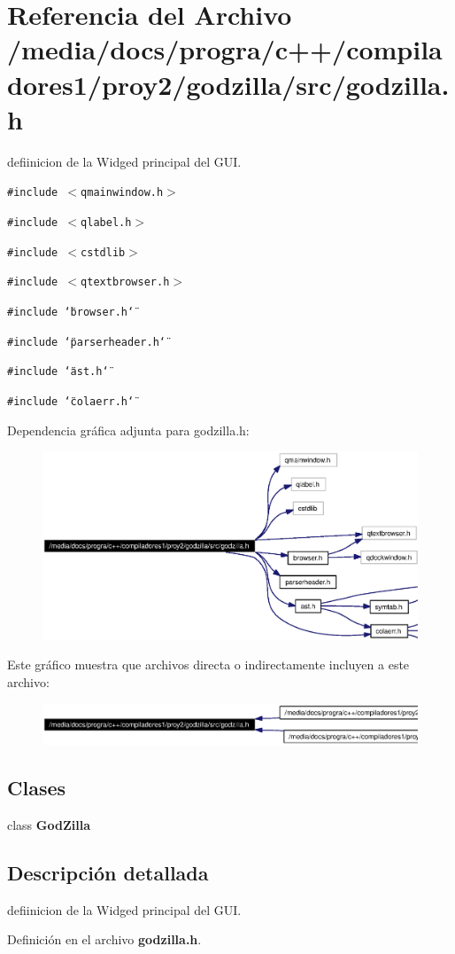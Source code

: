 \section{Referencia del Archivo /media/docs/progra/c++/compiladores1/proy2/godzilla/src/godzilla.h}
\label{godzilla_8h}
defiinicion de la Widged principal del GUI. 

{\tt \#include $<$qmainwindow.h$>$}\par
{\tt \#include $<$qlabel.h$>$}\par
{\tt \#include $<$cstdlib$>$}\par
{\tt \#include $<$qtextbrowser.h$>$}\par
{\tt \#include \char`\"{}browser.h\char`\"{}}\par
{\tt \#include \char`\"{}parserheader.h\char`\"{}}\par
{\tt \#include \char`\"{}ast.h\char`\"{}}\par
{\tt \#include \char`\"{}colaerr.h\char`\"{}}\par


Dependencia gr\'{a}fica adjunta para godzilla.h:\begin{figure}[H]
\begin{center}
\leavevmode
\includegraphics[width=352pt]{godzilla_8h__incl}
\end{center}
\end{figure}


Este gr\'{a}fico muestra que archivos directa o indirectamente incluyen a este archivo:\begin{figure}[H]
\begin{center}
\leavevmode
\includegraphics[width=358pt]{godzilla_8h__dep__incl}
\end{center}
\end{figure}
\subsection*{Clases}
\begin{CompactItemize}
\item 
class {\bf God\-Zilla}
\end{CompactItemize}


\subsection{Descripci\'{o}n detallada}
defiinicion de la Widged principal del GUI. 



Definici\'{o}n en el archivo {\bf godzilla.h}.